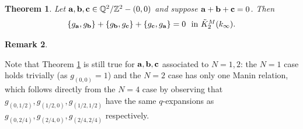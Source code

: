 \documentclass[12pt,amstex,amssymb]{article}
\theoremstyle{plain}
\newtheorem{theorem}{Theorem}[subsection]
\theoremstyle{definition}
\newtheorem{remark}[theorem]{Remark}
\def\Z{{\mathbb Z}}
\def\Q{{\mathbb Q}}
\newcommand{\ba}{\mathbf{a}}
\newcommand{\bb}{\mathbf{b}}
\newcommand{\bc}{{\bf c}}
\begin{document}
\begin{theorem}\label{sres}
	Let $\ba, \bb, \bc \in \Q^2/\Z^2-(0,0)$ and suppose $\ba + \bb + \bc = 0$.   Then
	$$
	\{g_\ba,g_\bb\} + \{g_\bb,g_\bc\} + \{g_\bc,g_\ba\} = 0\ \ \hbox{\rm in $\tilde K^M_2(k_\infty) $}.
	$$
\end{theorem}
	\begin{remark}\label{srescomment}
	
	Note that Theorem \ref{sres} is still true for $\ba, \bb, \bc$  %
	associated to $N=1,2$: the $N=1$ case holds trivially (as $g_{(0,0)}=1$) and the $N=2$ case has only one Manin relation, which follows directly from the $N=4$ case by observing that
	$g_{(0,1/2)}, g_{(1/2,0)}, g_{(1/2,1/2)}$
	have the same $q$-expansions as $g_{(0,2/4)}, g_{(2/4,0)}, g_{(2/4,2/4)}$ respectively.  
\end{remark}
\end{document}
